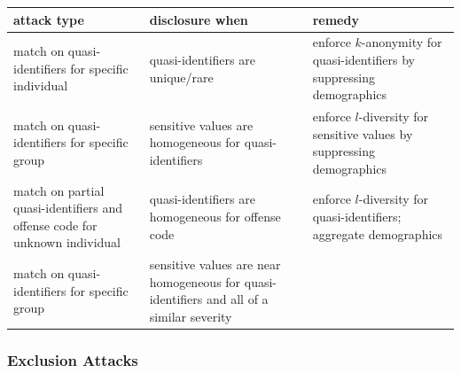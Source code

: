 \documentclass[]{article}
\begin{document}
\begin{center}
  \renewcommand{\arraystretch}{1.25}
   \begin{tabular}{p{141.156pt}p{141.156pt}p{141.156pt}}
    \textbf{attack type} & \textbf{disclosure when} & \textbf{remedy} \\ \hline
    match on quasi-identifiers for specific individual                         & quasi-identifiers are unique/rare                                                         & enforce $k$-anonymity for quasi-identifiers by suppressing demographics \\
    match on quasi-identifiers for specific group                              & sensitive values are homogeneous for quasi-identifiers                                    & enforce $l$-diversity for sensitive values by suppressing demographics  \\
    match on partial quasi-identifiers and offense code for unknown individual & quasi-identifiers are homogeneous for offense code                                        & enforce $l$-diversity for quasi-identifiers; aggregate demographics     \\
    match on quasi-identifiers for specific group                              & sensitive values are near homogeneous for quasi-identifiers and all of a similar severity & \color{red}{unknown}                                                   \\
  \end{tabular}
  \renewcommand{\arraystretch}{1.0}
\end{center}

\subsubsection{Exclusion Attacks}\label{exclusion-attacks}
\end{document}
